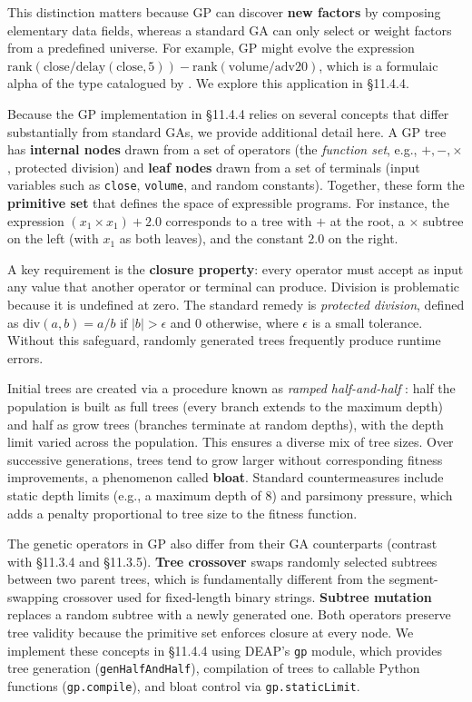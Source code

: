 This distinction matters because GP can discover \textbf{new factors} by composing elementary data fields, whereas a standard GA can only select or weight factors from a predefined universe. For example, GP might evolve the expression $\text{rank}(\text{close}/\text{delay}(\text{close}, 5)) - \text{rank}(\text{volume}/\text{adv20})$, which is a formulaic alpha of the type catalogued by \cite{Kakushadze2016}. We explore this application in §11.4.4.

Because the GP implementation in §11.4.4 relies on several concepts that differ substantially from standard GAs, we provide additional detail here. A GP tree has \textbf{internal nodes} drawn from a set of operators (the \textit{function set}, e.g., $+, -, \times$, protected division) and \textbf{leaf nodes} drawn from a set of terminals (input variables such as \texttt{close}, \texttt{volume}, and random constants). Together, these form the \textbf{primitive set} that defines the space of expressible programs. For instance, the expression $(x_1 \times x_1) + 2.0$ corresponds to a tree with $+$ at the root, a $\times$ subtree on the left (with $x_1$ as both leaves), and the constant 2.0 on the right.

A key requirement is the \textbf{closure property}: every operator must accept as input any value that another operator or terminal can produce. Division is problematic because it is undefined at zero. The standard remedy is \textit{protected division}, defined as $\text{div}(a, b) = a/b$ if $|b| > \epsilon$ and 0 otherwise, where $\epsilon$ is a small tolerance. Without this safeguard, randomly generated trees frequently produce runtime errors.

Initial trees are created via a procedure known as \textit{ramped half-and-half} \citep{Koza1992}: half the population is built as full trees (every branch extends to the maximum depth) and half as grow trees (branches terminate at random depths), with the depth limit varied across the population. This ensures a diverse mix of tree sizes. Over successive generations, trees tend to grow larger without corresponding fitness improvements, a phenomenon called \textbf{bloat}. Standard countermeasures include static depth limits (e.g., a maximum depth of 8) and parsimony pressure, which adds a penalty proportional to tree size to the fitness function.

The genetic operators in GP also differ from their GA counterparts (contrast with §11.3.4 and §11.3.5). \textbf{Tree crossover} swaps randomly selected subtrees between two parent trees, which is fundamentally different from the segment-swapping crossover used for fixed-length binary strings. \textbf{Subtree mutation} replaces a random subtree with a newly generated one. Both operators preserve tree validity because the primitive set enforces closure at every node. We implement these concepts in §11.4.4 using DEAP's \texttt{gp} module, which provides tree generation (\texttt{genHalfAndHalf}), compilation of trees to callable Python functions (\texttt{gp.compile}), and bloat control via \texttt{gp.staticLimit}.

